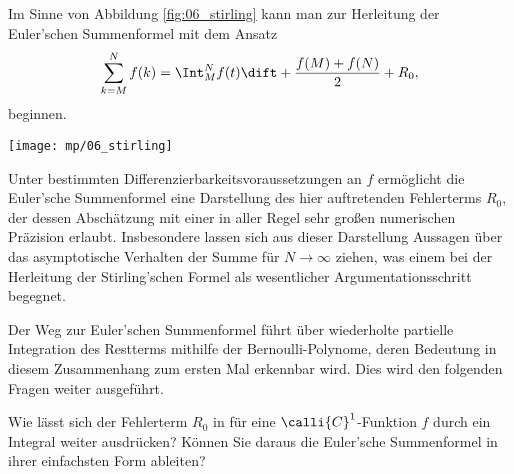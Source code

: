   \begin{antwort}
    Im Sinne von Abbildung \ref{fig:06_stirling} kann man zur Herleitung 
    der Euler'schen Summenformel mit dem Ansatz  
    \begin{equation}
      \sum_{k=M}^N f(k) = \Int_M^N f(t) \dift
      + \frac{f(M) +  f(N)}{2}  + R_0, 
      \notag
    \end{equation} 
    beginnen. 

    \begin{center}
      \texttt{[image: mp/06\_stirling]}
      \label{fig:06_stirling}
    \end{center}

    Unter bestimmten Differenzierbarkeitsvoraussetzungen an $f$ ermöglicht 
    die Euler'sche Summenformel eine Darstellung 
    des hier auftretenden Fehlerterms $R_0$, der dessen Abschätzung 
    mit einer in aller Regel sehr großen numerischen Präzision erlaubt. 
    Insbesondere lassen sich aus dieser Darstellung Aussagen 
    über das asymptotische Verhalten der Summe für $N\to \infty$ ziehen, 
    was einem {\zB} bei der Herleitung der Stirling'schen Formel 
    als wesentlicher Argumentationsschritt begegnet. 
    
    Der Weg zur Euler'schen Summenformel führt über wiederholte partielle 
    Integration des Restterms mithilfe der Bernoulli-Polynome, 
    deren Bedeutung in diesem Zusammenhang zum ersten Mal erkennbar wird. 
    Dies wird den folgenden Fragen weiter ausgeführt.  
    \AntEnd
  \end{antwort}

  \begin{frage}
    Wie lässt sich der Fehlerterm $R_0$ in {\astref} 
    für eine $\calli{C}^1$-Funktion $f$ durch ein Integral 
    weiter ausdrücken? Können Sie 
    daraus die Euler'sche Summenformel in ihrer einfachsten Form ableiten?
  \end{frage}

